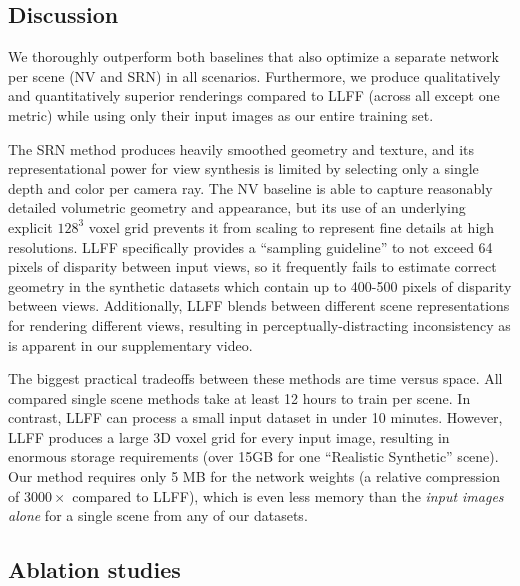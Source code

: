 \documentclass[runningheads]{llncs}
\begin{document}
\subsection{Discussion}

We thoroughly outperform both baselines that also optimize a separate network per scene (NV and SRN) in all scenarios.
Furthermore, we produce qualitatively and quantitatively superior renderings compared to LLFF (across all except one metric) while using only their input images as our entire training set.

The SRN method produces heavily smoothed geometry and texture, and its representational power for view synthesis is limited by selecting only a single depth and color per camera ray. The NV baseline is able to capture reasonably detailed volumetric geometry and appearance, but its use of an underlying explicit $128^3$ voxel grid prevents it from scaling to represent fine details at high resolutions. LLFF specifically provides a ``sampling guideline'' to not exceed 64 pixels of disparity between input views, so it frequently fails to estimate correct geometry in the synthetic datasets which contain up to 400-500 pixels of disparity between views. Additionally, LLFF blends between different scene representations for rendering different views, resulting in perceptually-distracting inconsistency as is apparent in our supplementary video. 

The biggest practical tradeoffs between these methods are time versus space. All compared single scene methods take at least 12 hours to train per scene. In contrast, LLFF can process a small input dataset in under 10 minutes. However, LLFF produces a large 3D voxel grid for every input image, resulting in enormous storage requirements (over 15GB for one ``Realistic Synthetic'' scene). Our method requires only 5 MB for the network weights (a relative compression of $3000\times$ compared to LLFF), which is even less memory than the \emph{input images alone} for a single scene from any of our datasets.

\subsection{Ablation studies}
\label{sec:ablations}
\end{document}
